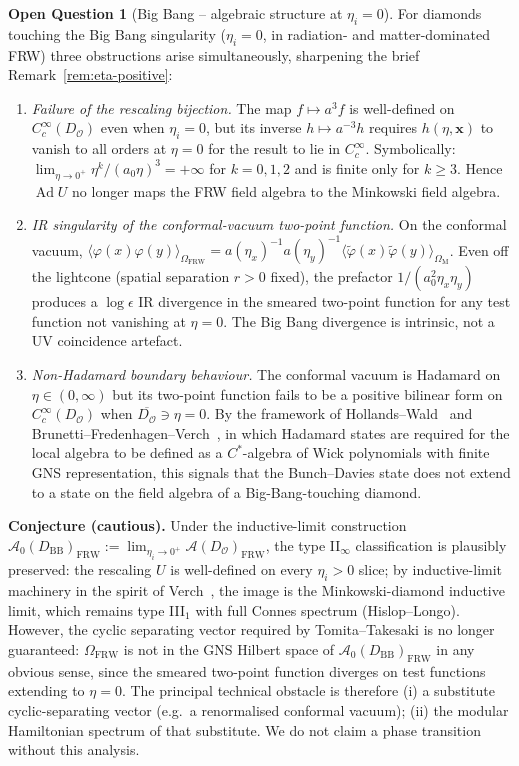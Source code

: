 \documentclass[11pt]{article}
\theoremstyle{definition}
\newtheorem{question}[theorem]{Open Question}
\renewcommand{\AA}{\mathcal{A}}
\newcommand{\OO}{\mathcal{O}}
\newcommand{\Ad}{\operatorname{Ad}}
\newcommand{\FRW}{\mathrm{FRW}}
\newcommand{\Mink}{\mathrm{M}}
\begin{document}
\begin{question}[Big Bang -- algebraic structure at $\eta_i=0$]\label{q:bigbang}
For diamonds touching the Big Bang singularity ($\eta_i=0$, in radiation- and matter-dominated FRW) three obstructions arise simultaneously, sharpening the brief Remark~\ref{rem:eta-positive}:
\begin{enumerate}
\item[(a)] \emph{Failure of the rescaling bijection.} The map $f\mapsto a^3 f$ is well-defined on $C_c^\infty(D_\OO)$ even when $\eta_i=0$, but its inverse $h\mapsto a^{-3} h$ requires $h(\eta,\mathbf{x})$ to vanish to all orders at $\eta=0$ for the result to lie in $C_c^\infty$. Symbolically: $\lim_{\eta\to 0^+}\eta^k/(a_0\eta)^3=+\infty$ for $k=0,1,2$ and is finite only for $k\ge 3$. Hence $\Ad U$ no longer maps the FRW field algebra to the Minkowski field algebra.
\item[(b)] \emph{IR singularity of the conformal-vacuum two-point function.} On the conformal vacuum, $\langle\varphi(x)\varphi(y)\rangle_{\Omega_\FRW}=a(\eta_x)^{-1}a(\eta_y)^{-1}\langle\tilde\varphi(x)\tilde\varphi(y)\rangle_{\Omega_\Mink}$. Even off the lightcone (spatial separation $r>0$ fixed), the prefactor $1/(a_0^2\eta_x\eta_y)$ produces a $\log\epsilon$ IR divergence in the smeared two-point function for any test function not vanishing at $\eta=0$. The Big Bang divergence is intrinsic, not a UV coincidence artefact.
\item[(c)] \emph{Non-Hadamard boundary behaviour.} The conformal vacuum is Hadamard on $\eta\in(0,\infty)$ but its two-point function fails to be a positive bilinear form on $C_c^\infty(D_\OO)$ when $\overline{D_\OO}\ni\eta=0$. By the framework of Hollands--Wald~\cite{HollandsWald2001} and Brunetti--Fredenhagen--Verch~\cite{BrunettiFredenhagenVerch2003}, in which Hadamard states are required for the local algebra to be defined as a $C^*$-algebra of Wick polynomials with finite GNS representation, this signals that the Bunch--Davies state does not extend to a state on the field algebra of a Big-Bang-touching diamond.
\end{enumerate}

\noindent\textbf{Conjecture (cautious).} Under the inductive-limit construction $\AA_0(D_{\mathrm{BB}})_\FRW := \lim_{\eta_i\to 0^+}\AA(D_\OO)_\FRW$, the type II$_\infty$ classification is plausibly preserved: the rescaling $U$ is well-defined on every $\eta_i>0$ slice; by inductive-limit machinery in the spirit of Verch~\cite{Verch1997}, the image is the Minkowski-diamond inductive limit, which remains type III$_1$ with full Connes spectrum (Hislop--Longo). However, the cyclic separating vector required by Tomita--Takesaki is no longer guaranteed: $\Omega_\FRW$ is not in the GNS Hilbert space of $\AA_0(D_{\mathrm{BB}})_\FRW$ in any obvious sense, since the smeared two-point function diverges on test functions extending to $\eta=0$. The principal technical obstacle is therefore (i) a substitute cyclic-separating vector (e.g.\ a renormalised conformal vacuum); (ii) the modular Hamiltonian spectrum of that substitute. We do not claim a phase transition without this analysis.


\end{question}
\end{document}
